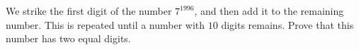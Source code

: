 We strike the first digit of the number $7^{1996}$, and then add it to the remaining number. This is repeated until a number with $10$ digits remains. Prove that this number has two equal digits.

